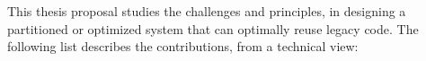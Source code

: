 %
%
%

This thesis proposal studies the challenges and principles,
in designing a partitioned or optimized system that can optimally reuse legacy code.
The following list describes the contributions,
from a technical view:

